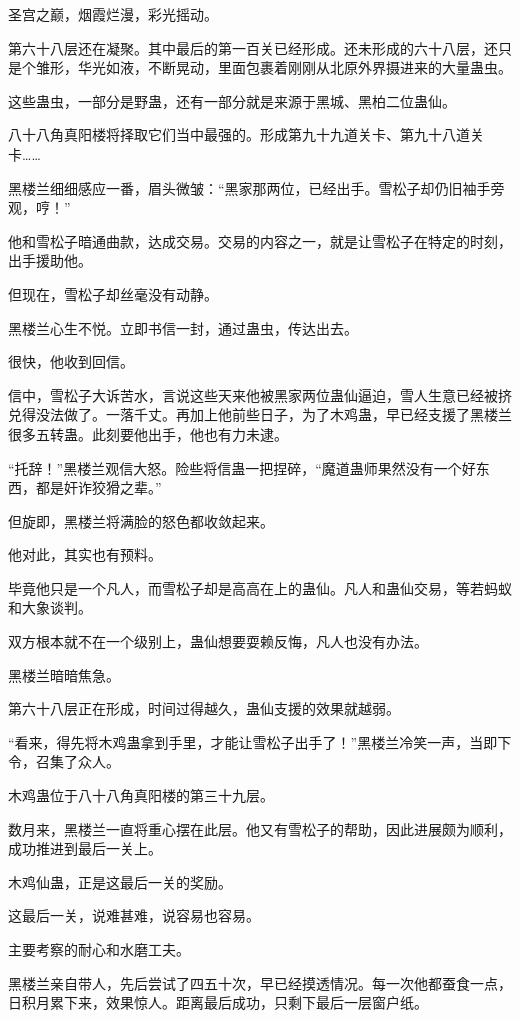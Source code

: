 \begin{this_body}
圣宫之巅，烟霞烂漫，彩光摇动。

第六十八层还在凝聚。其中最后的第一百关已经形成。还未形成的六十八层，还只是个雏形，华光如液，不断晃动，里面包裹着刚刚从北原外界摄进来的大量蛊虫。

这些蛊虫，一部分是野蛊，还有一部分就是来源于黑城、黑柏二位蛊仙。

八十八角真阳楼将择取它们当中最强的。形成第九十九道关卡、第九十八道关卡……

黑楼兰细细感应一番，眉头微皱：“黑家那两位，已经出手。雪松子却仍旧袖手旁观，哼！”

他和雪松子暗通曲款，达成交易。交易的内容之一，就是让雪松子在特定的时刻，出手援助他。

但现在，雪松子却丝毫没有动静。

黑楼兰心生不悦。立即书信一封，通过蛊虫，传达出去。

很快，他收到回信。

信中，雪松子大诉苦水，言说这些天来他被黑家两位蛊仙逼迫，雪人生意已经被挤兑得没法做了。一落千丈。再加上他前些日子，为了木鸡蛊，早已经支援了黑楼兰很多五转蛊。此刻要他出手，他也有力未逮。

“托辞！”黑楼兰观信大怒。险些将信蛊一把捏碎，“魔道蛊师果然没有一个好东西，都是奸诈狡猾之辈。”

但旋即，黑楼兰将满脸的怒色都收敛起来。

他对此，其实也有预料。

毕竟他只是一个凡人，而雪松子却是高高在上的蛊仙。凡人和蛊仙交易，等若蚂蚁和大象谈判。

双方根本就不在一个级别上，蛊仙想要耍赖反悔，凡人也没有办法。

黑楼兰暗暗焦急。

第六十八层正在形成，时间过得越久，蛊仙支援的效果就越弱。

“看来，得先将木鸡蛊拿到手里，才能让雪松子出手了！”黑楼兰冷笑一声，当即下令，召集了众人。

木鸡蛊位于八十八角真阳楼的第三十九层。

数月来，黑楼兰一直将重心摆在此层。他又有雪松子的帮助，因此进展颇为顺利，成功推进到最后一关上。

木鸡仙蛊，正是这最后一关的奖励。

这最后一关，说难甚难，说容易也容易。

主要考察的耐心和水磨工夫。

黑楼兰亲自带人，先后尝试了四五十次，早已经摸透情况。每一次他都蚕食一点，日积月累下来，效果惊人。距离最后成功，只剩下最后一层窗户纸。


\end{this_body}
